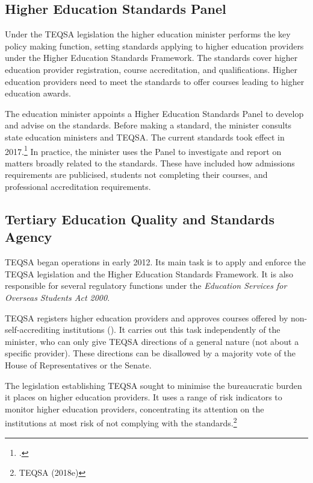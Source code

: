 \documentclass{grattan}
\begin{document}
%
\subsection{Higher Education Standards Panel}\label{subsec:higher-education-standards-panel}

Under the TEQSA legislation the higher education minister performs the key policy making function, setting standards applying to higher education providers under the Higher Education Standards Framework. The standards cover higher education provider registration, course accreditation, and qualifications. Higher education providers need to meet the standards to offer courses leading to higher education awards.

The education minister appoints a Higher Education Standards Panel to develop and advise on the standards. Before making a standard, the minister consults state education ministers and TEQSA. The current standards took effect in 2017.\footcite[][]{DepartmentofEducationandTraining2015highereducationre} In practice, the minister uses the Panel to investigate and report on matters broadly related to the standards. These have included how admissions requirements are publicised, students not completing their courses, and professional accreditation requirements.

%
\subsection{Tertiary Education Quality and Standards Agency}\label{subsec:tertiary-education-quality-and-standards-agency}

TEQSA began operations in early 2012. Its main task is to apply and enforce the TEQSA legislation and the Higher Education Standards Framework. It is also responsible for several regulatory functions under the \emph{Education Services for Overseas Students Act 2000}.

TEQSA registers higher education providers and approves courses offered by non-self-accrediting institutions (). It carries out this task independently of the minister, who can only give TEQSA directions of a general nature (not about a specific provider). These directions can be disallowed by a majority vote of the House of Representatives or the Senate.

The legislation establishing TEQSA sought to minimise the bureaucratic burden it places on higher education providers. It uses a range of risk indicators to monitor higher education providers, concentrating its attention on the institutions at most risk of not complying with the standards.\footnote{TEQSA (2018e)}
\end{document}
